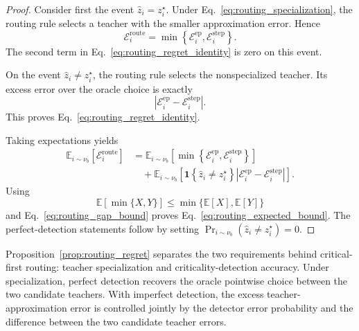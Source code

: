 \begin{proof}
Consider first the event
\(\widehat z_i=z_i^\star\). Under
Eq.~\ref{eq:routing_specialization}, the routing rule selects a teacher
with the smaller approximation error. Hence
\begin{equation*}
 \mathcal E_i^{\mathrm{route}}
 =
 \min
 \left\{
   \mathcal E_i^{\mathrm{ep}},
   \mathcal E_i^{\mathrm{step}}
 \right\}.
\end{equation*}
The second term in Eq.~\ref{eq:routing_regret_identity} is zero on this
event.

On the event
\(\widehat z_i\ne z_i^\star\), the routing rule selects the nonspecialized
teacher. Its excess error over the oracle choice is exactly
\begin{equation*}
 \left|
   \mathcal E_i^{\mathrm{ep}}
   -
   \mathcal E_i^{\mathrm{step}}
 \right|.
\end{equation*}
This proves Eq.~\ref{eq:routing_regret_identity}.

Taking expectations yields
\begin{equation*}
\begin{aligned}
 \mathbb E_{i\sim\nu_b}
 \left[
   \mathcal E_i^{\mathrm{route}}
 \right]
 &=
 \mathbb E_{i\sim\nu_b}
 \left[
   \min
   \left\{
     \mathcal E_i^{\mathrm{ep}},
     \mathcal E_i^{\mathrm{step}}
   \right\}
 \right]
 \\
 &\quad+
 \mathbb E_{i\sim\nu_b}
 \left[
   \mathbf 1
   \left\{
     \widehat z_i\ne z_i^\star
   \right\}
   \left|
     \mathcal E_i^{\mathrm{ep}}
     -
     \mathcal E_i^{\mathrm{step}}
   \right|
 \right].
\end{aligned}
\end{equation*}
Using
\begin{equation*}
 \mathbb E[\min\{X,Y\}]
 \le
 \min\{\mathbb E[X],\mathbb E[Y]\}
\end{equation*}
and Eq.~\ref{eq:routing_gap_bound} proves
Eq.~\ref{eq:routing_expected_bound}. The perfect-detection statements
follow by setting
\(\Pr_{i\sim\nu_b}(\widehat z_i\ne z_i^\star)=0\).
\end{proof}

Proposition~\ref{prop:routing_regret} separates the two requirements behind
critical-first routing: teacher specialization and criticality-detection
accuracy. Under specialization, perfect detection recovers the oracle
pointwise choice between the two candidate teachers. With imperfect
detection, the excess teacher-approximation error is controlled jointly by
the detector error probability and the difference between the two candidate
teacher errors.

